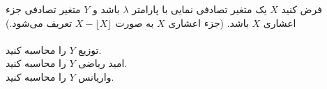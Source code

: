 \problem{}
فرض کنید \( X \) یک متغیر تصادفی نمایی با پارامتر \( \lambda \) باشد و \( Y \) متغیر تصادفی جزء اعشاری \( X \) باشد. (جزء اعشاری \( X \) به صورت \( X - \lfloor X \rfloor \) تعریف می‌شود.)
\\
\\
\subproblem{}
توزیع \( Y \) را محاسبه کنید.
\\
\subproblem{}
امید ریاضی \( Y \) را محاسبه کنید.
\\
\subproblem{}
واریانس \( Y \) را محاسبه کنید.
